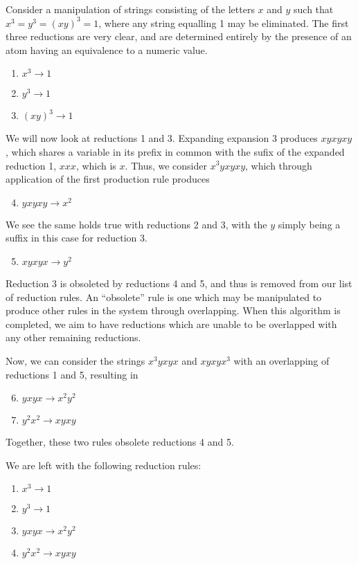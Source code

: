 \begin{example}
	Consider a manipulation of strings consisting of the letters $x$ and $y$ such that $x^3=y^3=(xy)^3=1$, where any string equalling 1 may be eliminated. The first three reductions are very clear, and are determined entirely by the presence of an atom having an equivalence to a numeric value.
	\begin{enumerate}
		\item $x^3 \rightarrow 1$
		\item $y^3 \rightarrow 1$
		\item $(xy)^3 \rightarrow 1$
	\end{enumerate}
	We will now look at reductions 1 and 3. Expanding expansion 3 produces $xyxyxy$, which shares a variable in its prefix in common with the sufix of the expanded reduction 1, $xxx$, which is $x$. Thus, we consider $x^3yxyxy$, which through application of the first production rule produces 
	\begin{enumerate}
		\setcounter{enumi}{3}
		\item $yxyxy \rightarrow x^2$
	\end{enumerate}
	We see the same holds true with reductions 2 and 3, with the $y$ simply being a suffix in this case for reduction 3.
	\begin{enumerate}
		\setcounter{enumi}{4}
		\item $xyxyx \rightarrow y^2$
	\end{enumerate}
	Reduction 3 is obsoleted by reductions 4 and 5, and thus is removed from our list of reduction rules. An ``obsolete'' rule is one which may be manipulated to produce other rules in the system through overlapping. When this algorithm is completed, we aim to have reductions which are unable to be overlapped with any other remaining reductions.

	Now, we can consider the strings $x^3yxyx$ and $xyxyx^3$ with an overlapping of reductions 1 and 5, resulting in
	\begin{enumerate}
		\setcounter{enumi}{5}
		\item $yxyx \rightarrow x^2y^2$
		\item $y^2x^2 \rightarrow xyxy$
	\end{enumerate}
	Together, these two rules obsolete reductions 4 and 5.	

	We are left with the following reduction rules:
	\begin{enumerate}
		\item $x^3 \rightarrow 1$
		\item $y^3 \rightarrow 1$
		\item $yxyx \rightarrow x^2y^2$
		\item $y^2x^2 \rightarrow xyxy$
	\end{enumerate}

\end{example}

